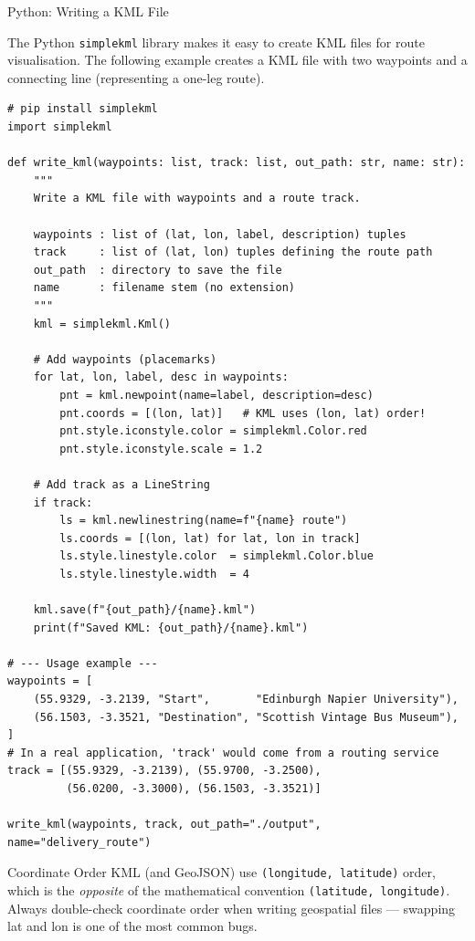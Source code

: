 \documentclass[aspectratio=169,10pt]{beamer}
\begin{document}
\begin{frame}[fragile]{Python: Writing a KML File}

  The Python \texttt{simplekml} library makes it easy to create KML files
  for route visualisation.  The following example creates a KML file with
  two waypoints and a connecting line (representing a one-leg route).

\begin{lstlisting}[style=pycode, caption={Writing a KML file with simplekml}]
# pip install simplekml
import simplekml

def write_kml(waypoints: list, track: list, out_path: str, name: str):
    """
    Write a KML file with waypoints and a route track.

    waypoints : list of (lat, lon, label, description) tuples
    track     : list of (lat, lon) tuples defining the route path
    out_path  : directory to save the file
    name      : filename stem (no extension)
    """
    kml = simplekml.Kml()

    # Add waypoints (placemarks)
    for lat, lon, label, desc in waypoints:
        pnt = kml.newpoint(name=label, description=desc)
        pnt.coords = [(lon, lat)]   # KML uses (lon, lat) order!
        pnt.style.iconstyle.color = simplekml.Color.red
        pnt.style.iconstyle.scale = 1.2

    # Add track as a LineString
    if track:
        ls = kml.newlinestring(name=f"{name} route")
        ls.coords = [(lon, lat) for lat, lon in track]
        ls.style.linestyle.color  = simplekml.Color.blue
        ls.style.linestyle.width  = 4

    kml.save(f"{out_path}/{name}.kml")
    print(f"Saved KML: {out_path}/{name}.kml")

# --- Usage example ---
waypoints = [
    (55.9329, -3.2139, "Start",       "Edinburgh Napier University"),
    (56.1503, -3.3521, "Destination", "Scottish Vintage Bus Museum"),
]
# In a real application, 'track' would come from a routing service
track = [(55.9329, -3.2139), (55.9700, -3.2500),
         (56.0200, -3.3000), (56.1503, -3.3521)]

write_kml(waypoints, track, out_path="./output", name="delivery_route")
\end{lstlisting}

  \begin{alertblock}{Coordinate Order}
    KML (and GeoJSON) use \texttt{(longitude, latitude)} order, which is
    the \emph{opposite} of the mathematical convention \texttt{(latitude,
    longitude)}.  Always double-check coordinate order when writing
    geospatial files --- swapping lat and lon is one of the most common bugs.
  \end{alertblock}

\end{frame}
\end{document}
